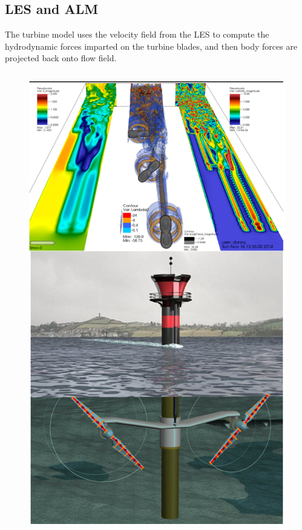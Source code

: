 \documentclass[xcolor=x11names,compress]{beamer}
\begin{document}
\subsection{LES and ALM}
\begin{frame}{}

\small The turbine model uses the 
velocity field from the LES to compute the 
hydrodynamic forces imparted on the turbine blades, and
then body forces are projected back onto flow field.

\vspace{-10pt}

\begin{columns}
		    
    \begin{column}{0.3\textwidth}

\vspace{-10pt}

        \begin{figure}[p]
		    \centering
		    \includegraphics[width=1.1\textwidth]{figures/LES_and_cartoon_actuator_line.png}
		\end{figure}


\end{column}
\end{columns}
\end{frame}
\end{document}
